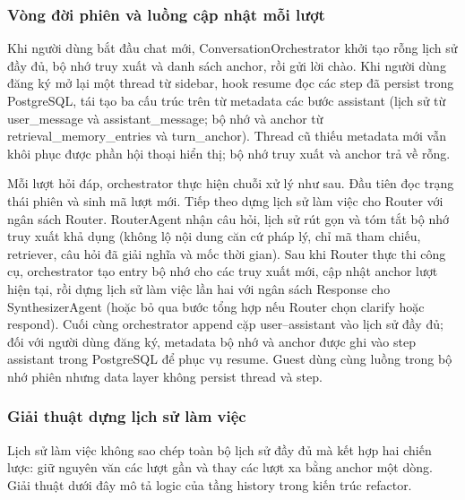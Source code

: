 \documentclass[../DoAn.tex]{subfiles}
\begin{document}
\subsubsection{Vòng đời phiên và luồng cập nhật mỗi lượt}

Khi người dùng bắt đầu chat mới, ConversationOrchestrator khởi tạo rỗng lịch sử đầy đủ, bộ nhớ truy xuất và danh sách anchor, rồi gửi lời chào. Khi người dùng đăng ký mở lại một thread từ sidebar, hook resume đọc các step đã persist trong PostgreSQL, tái tạo ba cấu trúc trên từ metadata các bước assistant (lịch sử từ user\_message và assistant\_message; bộ nhớ và anchor từ retrieval\_\allowbreak memory\_\allowbreak entries và turn\_\allowbreak anchor). Thread cũ thiếu metadata mới vẫn khôi phục được phần hội thoại hiển thị; bộ nhớ truy xuất và anchor trả về rỗng.

Mỗi lượt hỏi đáp, orchestrator thực hiện chuỗi xử lý như sau. Đầu tiên đọc trạng thái phiên và sinh mã lượt mới. Tiếp theo dựng lịch sử làm việc cho Router với ngân sách Router. RouterAgent nhận câu hỏi, lịch sử rút gọn và tóm tắt bộ nhớ truy xuất khả dụng (không lộ nội dung căn cứ pháp lý, chỉ mã tham chiếu, retriever, câu hỏi đã giải nghĩa và mốc thời gian). Sau khi Router thực thi công cụ, orchestrator tạo entry bộ nhớ cho các truy xuất mới, cập nhật anchor lượt hiện tại, rồi dựng lịch sử làm việc lần hai với ngân sách Response cho SynthesizerAgent (hoặc bỏ qua bước tổng hợp nếu Router chọn clarify hoặc respond). Cuối cùng orchestrator append cặp user--assistant vào lịch sử đầy đủ; đối với người dùng đăng ký, metadata bộ nhớ và anchor được ghi vào step assistant trong PostgreSQL để phục vụ resume. Guest dùng cùng luồng trong bộ nhớ phiên nhưng data layer không persist thread và step.

\subsubsection{Giải thuật dựng lịch sử làm việc}

Lịch sử làm việc không sao chép toàn bộ lịch sử đầy đủ mà kết hợp hai chiến lược: giữ nguyên văn các lượt gần và thay các lượt xa bằng anchor một dòng. Giải thuật dưới đây mô tả logic của tầng history trong kiến trúc refactor.
\end{document}
